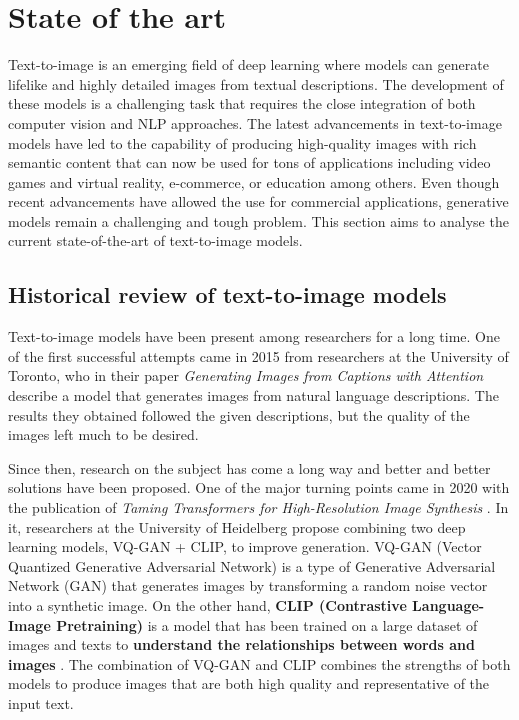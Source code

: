 \chapter{State of the art} \label{sec:colours}

Text-to-image is an emerging field of deep learning where models can generate lifelike and highly detailed images from textual descriptions. The development of these models is a challenging task that requires the close integration of both computer vision and NLP approaches. The latest advancements in text-to-image models have led to the capability of producing high-quality images with rich semantic content that can now be used for tons of applications including video games and virtual reality, e-commerce, or education among others. Even though recent advancements have allowed the use for commercial applications, generative models remain a challenging and tough problem. This section aims to analyse the current state-of-the-art of text-to-image models.

\section{Historical review of text-to-image models} \label{Hreview}

Text-to-image models have been present among researchers for a long time. One of the first successful attempts came in 2015 from researchers at the University of Toronto, who in their paper \textit{Generating Images from Captions with Attention} \cite{mansimov2015generating} describe a model that generates images from natural language descriptions. The results they obtained followed the given descriptions, but the quality of the images left much to be desired. 

Since then, research on the subject has come a long way and better and better solutions have been proposed. One of the major turning points came in 2020 with the publication of \textit{Taming Transformers for High-Resolution Image Synthesis} \cite{esser2021taming}. In it, researchers at the University of Heidelberg propose combining two deep learning models, VQ-GAN + CLIP, to improve generation. VQ-GAN (Vector Quantized Generative Adversarial Network) is a type of Generative Adversarial Network (GAN) \cite{goodfellow2020generative} that generates images by transforming a random noise vector into a synthetic image. On the other hand, \textbf{CLIP (Contrastive Language-Image Pretraining)} is a model that has been trained on a large dataset of images and texts to \textbf{understand the relationships between words and images} \cite{radford2021learning}. The combination of VQ-GAN and CLIP combines the strengths of both models to produce images that are both high quality and representative of the input text. 

